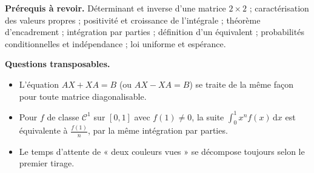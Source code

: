 \documentclass[11pt,a4paper]{article}
\providecommand{\tightlist}{\setlength{\itemsep}{0pt}\setlength{\parskip}{0pt}}
\begin{document}
\textbf{Prérequis à revoir.} Déterminant et inverse d'une matrice \(2\times2\) ; caractérisation des valeurs propres ; positivité et croissance de l'intégrale ; théorème d'encadrement ; intégration par parties ; définition d'un équivalent ; probabilités conditionnelles et indépendance ; loi uniforme et espérance.

\textbf{Questions transposables.}

\begin{itemize}
\tightlist
\item
  L'équation \(AX+XA=B\) (ou \(AX-XA=B\)) se traite de la même façon pour toute matrice diagonalisable.
\item
  Pour \(f\) de classe \(\mathcal C^1\) sur \([0,1]\) avec \(f(1)\neq0\), la suite \(\int_0^1x^nf(x)\,\mathrm dx\) est équivalente à \(\frac{f(1)}n\), par la même intégration par parties.
\item
  Le temps d'attente de « deux couleurs vues » se décompose toujours selon le premier tirage.
\end{itemize}
\end{document}
